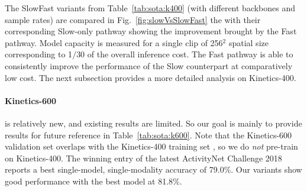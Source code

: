 \documentclass[10pt,twocolumn,letterpaper]{article}
\newcommand{\figref}[1]{Fig.~\ref{#1}}
\newcommand{\tblref}[1]{Table~\ref{#1}}
\begin{document}
	The SlowFast variants from \tblref{tab:sota:k400} (with different backbones and sample rates) are compared in \figref{fig:slowVsSlowFast} the  with their corresponding Slow-only pathway showing the improvement brought by the Fast pathway. Model capacity is measured for a single clip of 256$^2$ spatial size corresponding to 1$/$30 of the overall inference cost. The Fast pathway is able to consistently improve the performance of the Slow counterpart at comparatively low cost. The next subsection provides a more detailed analysis on Kinetics-400.
	
	\paragraph{Kinetics-600} is relatively new, and existing results are limited. So our goal is mainly to provide results for future reference in  \tblref{tab:sota:k600}.  Note that the Kinetics-600 validation set overlaps with the Kinetics-400 training set \cite{Carreira2018}, so we do \emph{not} pre-train on Kinetics-400. 
	The winning entry \cite{He2018} of the latest ActivityNet Challenge 2018 \cite{Ghanem2018} reports a best single-model, single-modality accuracy of 79.0\%. Our variants show good performance with the best model at 81.8\%.
	
\end{document}
